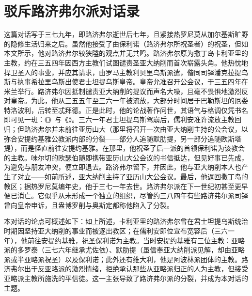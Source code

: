 
\chapter{驳斥路济弗尔派对话录}


这篇对话写于三七九年，即路济弗尔逝世后七年，且紧接热罗尼莫从加尔基斯旷野的隐修生活归来之后。虽然他接受了由保利诺（路济弗尔所祝圣者）的祝圣，但如本文所示，他对路济弗尔较狭隘的观点并无共鸣。路济弗尔原为撒丁岛卡利亚里的主教，约在三五四年因西方主教们试图谴责圣亚大纳削而首次崭露头角。他热忱地捍卫圣人的事业，并应其请求，由罗马主教利贝里乌斯派遣，偕同司铎潘克拉提乌斯与执事希拉里乌斯出使君士坦提乌斯皇帝。皇帝允准召开公会议，于三五四年在米兰举行。路济弗尔因抵制谴责亚大纳削的提议而声名大噪，且毫不畏惧地激烈反对皇帝。为此，他从三五五年至三六一年被流放，大部分时间居于巴勒斯坦的厄娄特洛波利，后转至忒拜德。正是此时，他的论战著作问世，其语气与格调仅凭书名即可见一斑：《》与《》。三六一年君士坦提乌斯驾崩后，儒利安准许流放主教回归；但路济弗尔并未前往亚历山大（那里将召开一次由亚大纳削主持的公会议，以弥合安提约基雅公教派内部的分裂——部分人追随默肋提，另一部分追随欧斯塔提），而是径直前往安提约基雅。在那里，他祝圣了后一派的首领保利诺为该教会的主教。味尔切的欧瑟伯随即携带亚历山大公会议的书信抵达，但见好事已先成，为避免与朋友冲突，便立即退去。路济弗尔留下，并因此，他与亚大纳削本人也产生了对立——如前所述，亚大纳削主持了亚历山大公会议。最后，他返回撒丁岛的教区；据热罗尼莫编年史，他于三七一年去世。路济弗尔派在下一世纪初甚至更早便已消亡。它似乎从未形成一个独立的组织，尽管约三八四年有些路济弗尔派司铎曾向皇帝申诉，且盎博罗削与奥斯定都称他陷入了分裂。\par

本对话的论点可概述如下：如上所述，卡利亚里的路济弗尔曾在君士坦提乌斯统治时期因坚持亚大纳削的事业而被逐出教区；在儒利安即位宣布宽容后（三六一年），他前往安提约基雅，祝圣保利诺为主教。当时安提约基雅有三位主教：亚略派的多罗泰（三七六年继承尤佐依）、默肋提（虽信奉亚大纳削派见解，却由亚略派或半亚略派祝圣）以及保利诺；此外还有维大利，他是阿波林派团体的主教。路济弗尔出于反亚略派的激烈情绪，拒绝承认那些从亚略派归正的人为主教，但接受亚略派主教所施洗的平信徒。这一主张导致了路济弗尔派的分裂，并成为本对话的主题。\par

